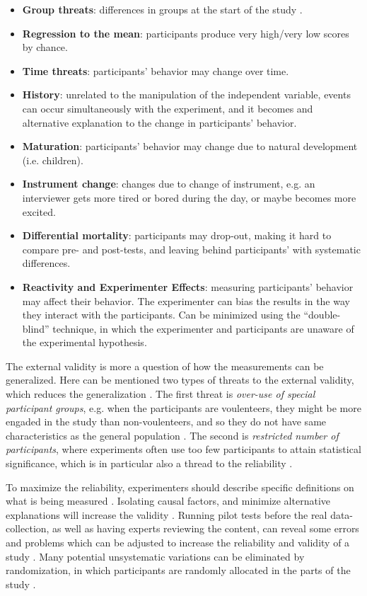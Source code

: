 \begin{itemize}
\item \textbf{Group threats}: differences in groups at the start of the study .
\item \textbf{Regression to the mean}: participants produce very high/very low scores by chance.
\item \textbf{Time threats}: participants' behavior may change over time.
\item \textbf{History}: unrelated to the manipulation of the independent variable, events can occur simultaneously with the experiment, and it becomes and alternative explanation to the change in participants’ behavior. 
\item \textbf{Maturation}: participants’ behavior may change due to natural development (i.e. children). 
\item \textbf{Instrument change}: changes due to change of instrument, e.g. an interviewer gets more tired or bored during the day, or maybe becomes more excited. 
\item \textbf{Differential mortality}: participants may drop-out, making it hard to compare pre- and post-tests, and leaving behind participants’ with systematic differences.
\item \textbf{Reactivity and Experimenter Effects}: measuring participants’ behavior may affect their behavior. The experimenter can bias the results in the way they interact with the participants. Can be minimized using the “double-blind” technique, in which the experimenter and participants are unaware of the experimental hypothesis.
\end{itemize} 

The external validity is more a question of how the measurements can be generalized. Here can be mentioned two types of threats to the external validity, which reduces the generalization \citep[p. 62]{Design}. The first threat is \textit{over-use of special participant groups}, e.g. when the participants are voulenteers, they might be more engaded in the study than non-voulenteers, and so they do not have same characteristics as the general population \citep{Lard}. The second is \textit{restricted number of participants}, where experiments often use too few participants to attain statistical significance, which is in particular also a thread to the reliability \citep[p. 62]{Design}.

To maximize the reliability, experimenters should describe specific definitions on what is being measured \citep[p. 57]{Design}. Isolating causal factors, and minimize alternative explanations will increase the validity \citep[p. 62]{Design}. Running pilot tests before the real data-collection, as well as having experts reviewing the content, can reveal some errors and problems which can be adjusted to increase the reliability and validity of a study \citep[p. 407-408]{ResearchMethods} \citep{NCTI}. Many potential unsystematic variations can be eliminated by randomization, in which participants are randomly allocated in the parts of the study \citep[p. 24]{Design}.